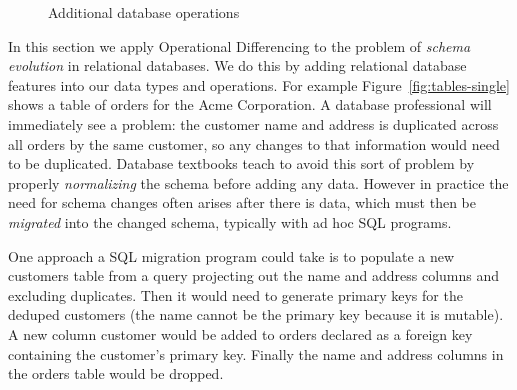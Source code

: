 \documentclass[english,submission]{programming}
\theoremstyle{definition}
\newcommand{\citet}[1]{\citeauthor*{#1}~\cite{#1}}
\begin{document}
\begin{figure}
  \caption{Additional database operations}
  \label{fig:db-operations}
\end{figure}

In this section we apply Operational Differencing to the problem of \textit{schema evolution} in relational databases. We do this by adding relational database features into our data types and operations.
For example Figure~\ref{fig:tables-single} shows a table of orders for the Acme Corporation. A database professional will immediately see a problem: the customer name and address is duplicated across all orders by the same customer, so any changes to that information would need to be duplicated.
Database textbooks teach to avoid this sort of problem by properly \textit{normalizing} the schema before adding any data. However in practice the need for schema changes often arises after there is data, which must then be \textit{migrated} into the changed schema, typically with ad hoc SQL programs.

One approach a SQL migration program could take is to populate a new \textsf{customers} table from a query projecting out the \textsf{name} and \textsf{address} columns and excluding duplicates. Then it would need to generate primary keys for the deduped customers (the name cannot be the primary key because it is mutable). A new column \textsf{customer} would be added to \textsf{orders} declared as a foreign key containing the customer's primary key. Finally the \textsf{name} and \textsf{address} columns in the \textsf{orders} table would be dropped.
\end{document}

